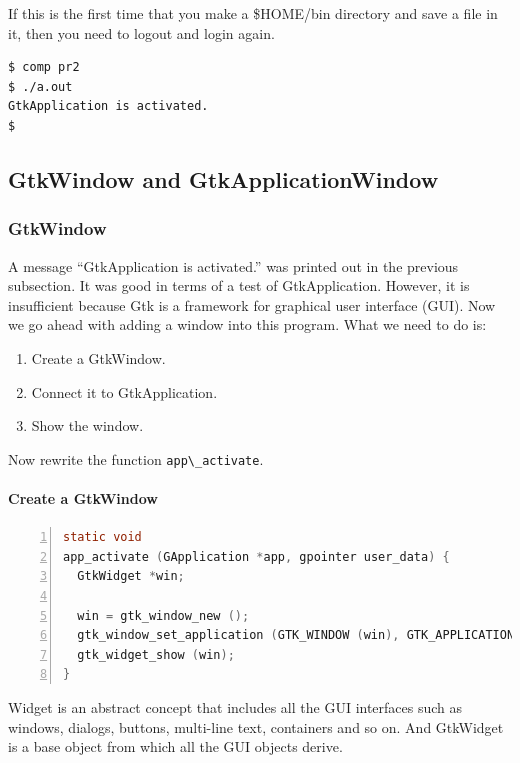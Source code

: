 If this is the first time that you make a \$HOME/bin directory and save
a file in it, then you need to logout and login again.

\begin{lstlisting}
$ comp pr2
$ ./a.out
GtkApplication is activated.
$
\end{lstlisting}

\hypertarget{gtkwindow-and-gtkapplicationwindow}{%
\subsection{GtkWindow and
GtkApplicationWindow}\label{gtkwindow-and-gtkapplicationwindow}}

\hypertarget{gtkwindow}{%
\subsubsection{GtkWindow}\label{gtkwindow}}

A message ``GtkApplication is activated.'' was printed out in the
previous subsection. It was good in terms of a test of GtkApplication.
However, it is insufficient because Gtk is a framework for graphical
user interface (GUI). Now we go ahead with adding a window into this
program. What we need to do is:

\begin{enumerate}
\def\labelenumi{\arabic{enumi}.}
\tightlist
\item
  Create a GtkWindow.
\item
  Connect it to GtkApplication.
\item
  Show the window.
\end{enumerate}

Now rewrite the function \passthrough{\lstinline!app\_activate!}.

\hypertarget{create-a-gtkwindow}{%
\paragraph{Create a GtkWindow}\label{create-a-gtkwindow}}

\begin{lstlisting}[language=C, numbers=left]
static void
app_activate (GApplication *app, gpointer user_data) {
  GtkWidget *win;

  win = gtk_window_new ();
  gtk_window_set_application (GTK_WINDOW (win), GTK_APPLICATION (app));
  gtk_widget_show (win);
}
\end{lstlisting}

Widget is an abstract concept that includes all the GUI interfaces such
as windows, dialogs, buttons, multi-line text, containers and so on. And
GtkWidget is a base object from which all the GUI objects derive.


